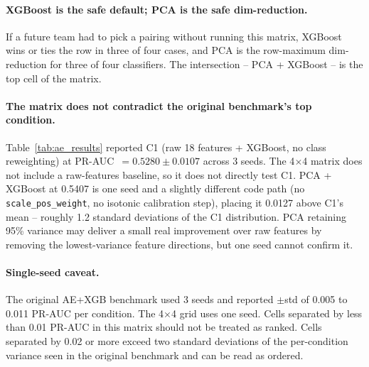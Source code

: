 \documentclass[12pt,a4paper]{article}
\begin{document}
\paragraph{XGBoost is the safe default; PCA is the safe dim-reduction.}
If a future team had to pick a pairing without running this matrix, XGBoost
wins or ties the row in three of four cases, and PCA is the row-maximum
dim-reduction for three of four classifiers. The intersection -- PCA +
XGBoost -- is the top cell of the matrix.

\paragraph{The matrix does not contradict the original benchmark's top condition.}
Table~\ref{tab:ae_results} reported C1 (raw 18 features + XGBoost, no class
reweighting) at PR-AUC~$= 0.5280 \pm 0.0107$ across 3 seeds. The 4$\times$4
matrix does not include a raw-features baseline, so it does not directly
test C1. PCA + XGBoost at 0.5407 is one seed and a slightly different code
path (no \texttt{scale\_pos\_weight}, no isotonic calibration step), placing
it 0.0127 above C1's mean -- roughly 1.2 standard deviations of the C1
distribution. PCA retaining 95\% variance may deliver a small real
improvement over raw features by removing the lowest-variance feature
directions, but one seed cannot confirm it.

\paragraph{Single-seed caveat.}
The original AE+XGB benchmark used 3 seeds and reported $\pm$std of 0.005
to 0.011 PR-AUC per condition. The 4$\times$4 grid uses one seed. Cells
separated by less than 0.01 PR-AUC in this matrix should not be treated
as ranked. Cells separated by 0.02 or more exceed two standard deviations
of the per-condition variance seen in the original benchmark and can be
read as ordered.
\end{document}
